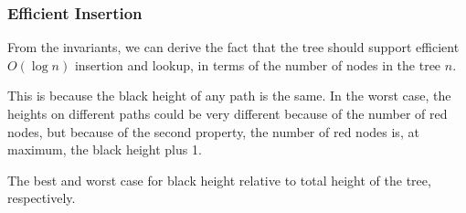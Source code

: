 \documentclass[aspectratio=169]{beamer}
\begin{document}
\begin{frame}[fragile]
  \frametitle{Efficient Insertion}

  From the invariants, we can derive the fact that the tree should support
  efficient $O(\log n)$ insertion and lookup, in terms
  of the number of nodes in the tree $n$.

  \pause
  \vspace{\fill}

  This is because the black height of any path is the same. In the worst case,
  the heights on different paths could be very different because of the number of
  red nodes, but because of the second property, the number of red nodes is,
  at maximum, the black height plus 1.

  \pause
  \vspace{\fill}

  \begin{minipage}{0.33\textwidth}
    \begin{center}
    \end{center}
  \end{minipage}
  \begin{minipage}{0.32\textwidth}
    \begin{center}
      \small
      The best and worst case for black height relative to total height of the tree,
      respectively.

    \end{center}
  \end{minipage}
  \begin{minipage}{0.33\textwidth}
    \begin{center}
    \end{center}
  \end{minipage}
\end{frame}
\end{document}
